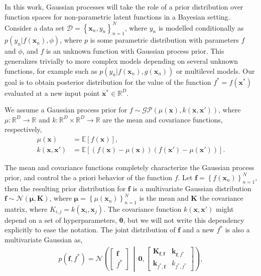 \documentclass[]{interact}
\theoremstyle{plain}%
\theoremstyle{definition}
\theoremstyle{remark}
\begin{document}
In this work, Gaussian processes will take the role of a prior distribution over function spaces for non-parametric latent functions in a Bayesian setting. 
Consider a data set $\mathcal{D} = \left\lbrace \mathbf{x}_n, y_n \right\rbrace_{n=1}^N$, where $y_n$ is modelled conditionally as $p(y_n|f(\mathbf{x}_n),\phi)$, where $p$ is some parametric distribution with parameters $f$ and $\phi$, and $f$ is an unknown function with Gaussian process prior. This generalizes trivially to more complex models depending on several unknown functions, for example such as $p(y_n|f(\mathbf{x}_n),g(\mathbf{x}_n))$ or multilevel models. Our goal is to obtain posterior distribution for the value of the function $f^*=f(\mathbf{x}^*)$  evaluated at a new input point $\mathbf{x}^* \in \mathbb{R}^D$.

We assume a Gaussian process prior for $f \sim \mathcal{GP}(\mu(\mathbf{x}), k(\mathbf{x}, \mathbf{x}'))$, where $\mu: \mathbb{R}^D \rightarrow \mathbb{R}$ and $k: \mathbb{R}^D \times \mathbb{R}^D \rightarrow \mathbb{R}$ are the mean and covariance functions, respectively,
%
\begin{align*}
 	\mu(\mathbf{x}) &= \mathbb{E}\!\left[f(\mathbf{x})\right],\\ 
 	k(\mathbf{x}, \mathbf{x}') &= \mathbb{E}\!\left[\left( f(\mathbf{x}) - \mu(\mathbf{x}) \right)\left( f(\mathbf{x}') - \mu(\mathbf{x}') \right)\right].
\end{align*} 

The mean and covariance functions completely characterize the Gaussian process prior, and control the a priori behavior of the function $f$. Let $\mathbf{f}=\left\lbrace f(\mathbf{x}_n) \right\rbrace_{n=1}^N$, then the resulting prior distribution for $\mathbf{f}$ is a multivariate Gaussian distribution
$\mathbf{f} \sim \mathcal{N}(\boldsymbol{\mu}, \mathbf{K})$,
 where $\boldsymbol{\mu} = \left\lbrace \mu(\mathbf{x}_n) \right\rbrace_{n=1}^N$ is the mean and $\mathbf{K}$ the covariance matrix, where $K_{i,j}=k(\mathbf{x}_i,\mathbf{x}_j)$. The covariance function $k(\textbf{x}, \textbf{x}')$ might depend on a set of hyperparameters, $\bm{\theta}$, but we will not write this dependency explicitly to ease the notation.
The joint distribution of $\mathbf{f}$ and a new $f^*$ is also a multivariate Gaussian as,
%
\begin{align*}
p(\mathbf{f}, f^*)=\mathcal{N} \left( \left[ \begin{array}{cc}
\mathbf{f} \\ 
f^*
\end{array} \right] \,\middle|\, \mathbf{0},\left[ \begin{array}{cc}
\mathbf{K}_{\mathbf{f},\mathbf{f}} & \mathbf{k}_{\mathbf{f},f^*} \\ 
\mathbf{k}_{f^*,\mathbf{f}} & k_{f^*,f^*}
\end{array} \right] \right),
\end{align*} 
\end{document}
